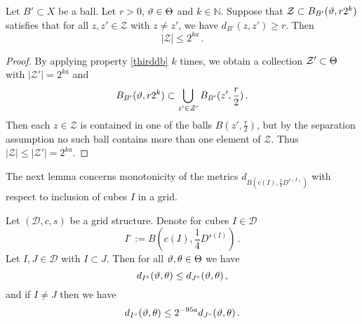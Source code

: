 \begin{lemma}
    \label{ball-metric-entropy}
    Let $B' \subset X$ be a ball. Let $r > 0$, ${\vartheta} \in {\Theta}$ and $k \in \mathbb{N}$. Suppose that $\mathcal{Z} \subset B_{B'}({\vartheta}, r2^k)$  satisfies that for all $z, z' \in \mathcal{Z}$ with $z \ne z'$, we have $d_{B'}(z,z') \ge r$. Then
    $$
        |\mathcal{Z}| \le 2^{ka}\,.
    $$
\end{lemma}

\begin{proof}
    By applying property \eqref{thirddb}  $k$ times, we obtain a collection $\mathcal{Z}' \subset {\Theta}$ with $|\mathcal{Z}'| = 2^{ka}$ and
    $$
        B_{B'}({\vartheta},r2^k) \subset \bigcup_{z' \in \mathcal{Z}'} B_{B'}(z', \frac{r}{2})\,.
    $$
    Then each $z \in \mathcal{Z}$ is contained in one of the balls $B(z', \frac{r}{2})$, but by the separation assumption no such ball contains more than one element of $\mathcal{Z}$. Thus $|\mathcal{Z}| \le |\mathcal{Z}'| = 2^{ka}$.
\end{proof}

The next lemma concerns monotonicity of the metrics $d_{B(c(I), \frac 14 D^{s(I)})}$ with respect to inclusion of cubes $I$ in a grid.

\begin{lemma}
    \label{monotone-cube-metrics}
    Let $(\mathcal{D}, c, s)$ be a grid structure. Denote for cubes $I \in \mathcal{D}$
    $$
        I^\circ := B(c(I), \frac{1}{4} D^{s(I)})\,.
    $$
    Let $I, J \in \mathcal{D}$ with $I \subset J$.
    Then for all ${\vartheta}, {\theta} \in{\Theta}$ we have
    $$
        d_{I^\circ}({\vartheta}, {\theta}) \le d_{J^\circ}({\vartheta}, {\theta})\,,
    $$
    and if $I \ne J$ then we have
    $$
        d_{I^\circ}({\vartheta}, {\theta}) \le 2^{-95a} d_{J^\circ}({\vartheta}, {\theta})\,.
    $$
\end{lemma}

